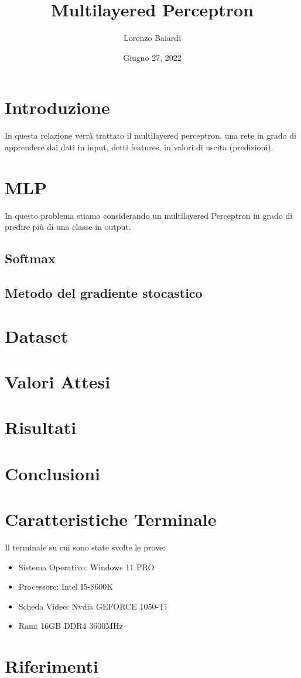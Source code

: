 \documentclass{article}
\title{Multilayered Perceptron}
\author{Lorenzo Baiardi}
\date{Giugno 27, 2022}
\begin{document}
\maketitle

    \section{Introduzione}\label{sec:introduzione}
        In questa relazione verrà trattato il multilayered perceptron, una rete in grado di apprendere dai dati in input,
        detti features, in valori di uscita (predizioni).
    \section{MLP}\label{sec:tipologia}
        In questo problema stiamo considerando un multilayered Perceptron in grado di predire più di una classe in output.
    \subsection{Softmax}\label{subsec:softmax}
    \subsection{Metodo del gradiente stocastico}\label{subsec:metodo-del-gradiente-stocastico}
    \section{Dataset}\label{sec:dataset}
    \section{Valori Attesi}\label{sec:valori-attesi}
    \section{Risultati}\label{sec:risultati}
    \section{Conclusioni}\label{sec:conclusioni}
    \section{Caratteristiche Terminale}\label{sec:caratteristiche-terminale}
        Il terminale su cui sono state svolte le prove:
        \begin{itemize}
            \item Sistema Operativo: Windows 11 PRO
            \item Processore: Intel I5-8600K
            \item Scheda Video: Nvdia GEFORCE 1050-Ti
            \item Ram: 16GB DDR4 3600MHz
        \end{itemize}
    \section{Riferimenti}\label{sec:riferimenti}
\end{document}
